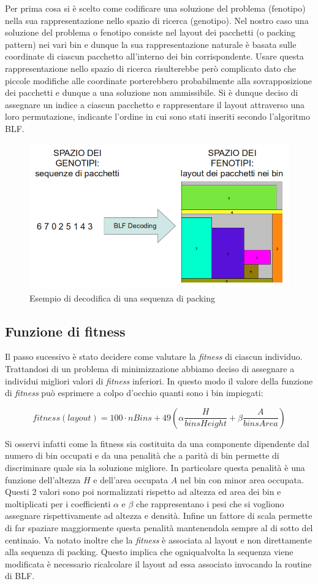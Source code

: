 Per prima cosa si è scelto come codificare una soluzione del problema (fenotipo) nella sua rappresentazione nello spazio di ricerca (genotipo). Nel nostro caso una soluzione del problema o fenotipo consiste nel layout dei pacchetti (o packing pattern) nei vari bin e dunque la sua rappresentazione naturale è basata sulle coordinate di ciascun pacchetto all'interno dei bin corrispondente. Usare questa rappresentazione nello spazio di ricerca risulterebbe però complicato dato che piccole modifiche alle coordinate porterebbero probabilmente alla sovrapposizione dei pacchetti e dunque a una soluzione non ammissibile. Si è dunque deciso di assegnare un indice a ciascun pacchetto e rappresentare il layout attraverso una loro permutazione, indicante l'ordine in cui sono stati inseriti secondo l'algoritmo BLF.
\begin{figure}[htb]
  \centering
  \includegraphics[height=0.4\textwidth]{./img/encoding.png}
  \caption{Esempio di decodifica di una sequenza di packing}
  \label{img:encoding}
\end{figure}
\subsection{Funzione di fitness}
Il passo sucessivo è stato decidere come valutare la \emph{fitness} di ciascun individuo. Trattandosi di un problema di minimizzazione abbiamo deciso di assegnare a individui migliori valori di \emph{fitness} inferiori. In questo modo il valore della funzione di \emph{fitness} può esprimere a colpo d'occhio quanti sono i bin impiegati:

\[
   fitness(layout)= 100\cdot nBins + 49(\alpha\frac{H}{binsHeight}+\beta\frac{A}{binsArea})
\]

Si osservi infatti come la fitness sia costituita da una componente dipendente dal numero di bin occupati e da una penalità che a parità di bin permette di discriminare quale sia la soluzione migliore. In particolare questa penalità è una funzione dell'altezza \emph{$H$} e dell'area occupata \emph{$A$} nel bin con minor area occupata. Questi 2 valori sono poi normalizzati rispetto ad altezza ed area dei bin e moltiplicati per i coefficienti \emph{$\alpha$} e \emph{$\beta$} che rappresentano i pesi che si vogliono assegnare rispettivamente ad altezza e densità. Infine un fattore di scala permette di far spaziare maggiormente questa penalità mantenendola sempre al di sotto del centinaio.
Va notato inoltre che la \emph{fitness} è associata al layout e non direttamente alla sequenza di packing. Questo implica che ogniqualvolta la sequenza viene modificata è necessario ricalcolare il layout ad essa associato invocando la routine di BLF.
